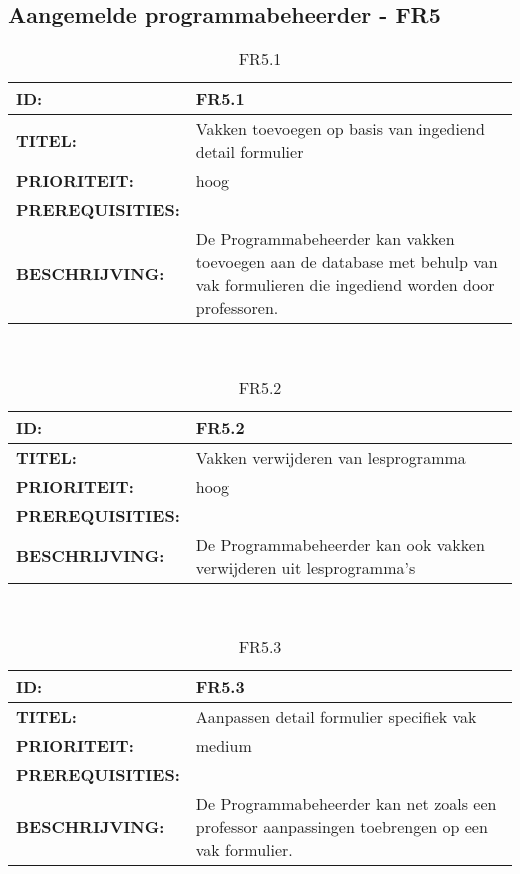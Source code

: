 \subsection{Aangemelde programmabeheerder - FR5}

\noindent\begin{table}[h]
            \begin{tabular}{l | p{10cm}}
                \textbf{ID:} & FR5.1 \\ \hline
                \textbf{TITEL:} & Vakken toevoegen op basis van ingediend detail formulier\\ \hline
                \textbf{PRIORITEIT:} &  hoog \\ \hline
                \textbf{PREREQUISITIES:} & \\ \hline
                \textbf{BESCHRIJVING:} & De Programmabeheerder kan vakken toevoegen aan de database met behulp van vak formulieren die ingediend worden door professoren. \\ 
            \end{tabular}\\
            \caption{FR5.1}
            \label{tab:myfifteenthtable}
        \end{table}
        
\noindent\begin{table}[h]
            \begin{tabular}{l | p{10cm}}
                \textbf{ID:} & FR5.2 \\ \hline
                \textbf{TITEL:} & Vakken verwijderen van lesprogramma\\ \hline
                \textbf{PRIORITEIT:} &  hoog \\ \hline
                \textbf{PREREQUISITIES:} & \\ \hline
                \textbf{BESCHRIJVING:} & De Programmabeheerder kan ook vakken verwijderen uit lesprogramma’s \\ 
            \end{tabular}\\
            \caption{FR5.2}
            \label{tab:myfifteenthtable}
        \end{table}
        
\noindent\begin{table}[h]
            \begin{tabular}{l | p{10cm}}
                \textbf{ID:} & FR5.3 \\ \hline
                \textbf{TITEL:} & Aanpassen detail formulier specifiek vak\\ \hline
                \textbf{PRIORITEIT:} &  medium \\ \hline
                \textbf{PREREQUISITIES:} & \\ \hline
                \textbf{BESCHRIJVING:} & De Programmabeheerder kan net zoals een professor aanpassingen toebrengen op een vak formulier. \\ 
            \end{tabular}\\
            \caption{FR5.3}
            \label{tab:myfifteenthtable}
        \end{table}
        
